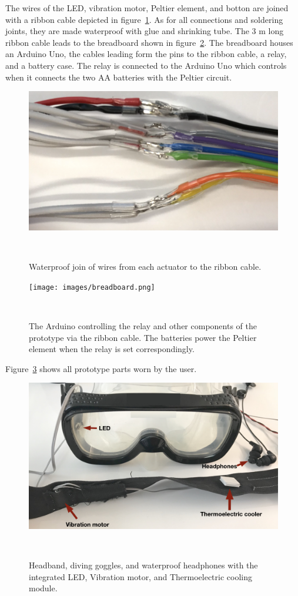 The wires of the LED, vibration motor, Peltier element, and botton are joined with a ribbon cable depicted in figure~\ref{fig:wires}.
As for all connections and soldering joints, they are made waterproof with glue and shrinking tube.
The  3 m long ribbon cable leads to the breadboard shown in figure~\ref{fig:breadboard}.
The breadboard houses an Arduino Uno, the cables leading form the pins to the ribbon cable, a relay, and a battery case.
The relay is connected to the Arduino Uno  which controls when it connects the two AA batteries with the Peltier circuit.


\begin{figure}
	\includegraphics[width= \textwidth]{images/wires.png}
	\caption{Waterproof join of wires from each actuator to the ribbon cable.}~\label{fig:wires}
\end{figure}

\begin{figure}
	\texttt{[image: images/breadboard.png]}
	\caption{The Arduino controlling the relay and other components of the prototype via the ribbon cable. The batteries power the Peltier element when the relay is set correspondingly.}~\label{fig:breadboard}
\end{figure}


Figure~\ref{fig:studysetupcut} shows all prototype parts worn by the user.
 
\begin{figure}
	\includegraphics[width= \textwidth]{images/studysetupcut.png}
	\caption{Headband, diving goggles, and waterproof headphones with the integrated LED, Vibration motor, and Thermoelectric cooling module.}~\label{fig:studysetupcut}
\end{figure}


